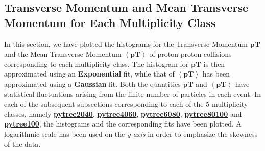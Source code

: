 \documentclass[letterpaper,aps,prc,superscriptaddress,nofootinbib,10pt,showpacs,floatfix]{revtex4-2}%
\begin{document}












\subsection{Transverse Momentum and Mean Transverse Momentum for Each Multiplicity Class}
In this section, we have plotted the histograms for the Transverse Momentum $\mathbf{pT}$ and the Mean Transverse Momentum $\mathbf{\left<pT\right>}$ of proton-proton collisions corresponding to each multiplicity class. The histogram for $\mathbf{pT}$ is then approximated using an \textbf{Exponential} fit, while that of $\mathbf{\left<pT\right>}$ has been approximated using a \textbf{Gaussian} fit. Both the quantities $\mathbf{pT}$ and $\mathbf{\left<pT\right>}$ have statistical fluctuations arising from the finite number of particles in each event. In each of the subsequent subsections corresponding to each of the 5 multiplicity classes, namely \hyperref[subsubsec:2040]{\textbf{pytree2040}}, \hyperref[subsubsec:4060]{\textbf{pytree4060}}, \hyperref[subsubsec:6080]{\textbf{pytree6080}}, \hyperref[subsubsec:80100]{\textbf{pytree80100}} and \hyperref[subsubsec:100]{\textbf{pytree100}}, the histograms and the corresponding fits have been plotted. A logarithmic scale has been used on the \emph{y-axis} in order to emphasize the skewness of the data. 
\end{document}
